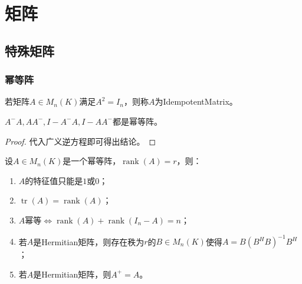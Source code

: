 \chapter{矩阵}









\section{特殊矩阵}
\subsection{幂等阵}
\begin{definition}
	若矩阵$A\in M_{n}(K)$满足$A^2=I_n$，则称$A$为\gls{IdempotentMatrix}。
\end{definition}
\begin{theorem}\label{theo:A^-AIdempotent}
	$A^-A,AA^-,I-A^-A,I-AA^-$都是幂等阵。
\end{theorem}
\begin{proof}
	代入广义逆方程即可得出结论。
\end{proof}
\begin{property}\label{prop:IdempotentMat}
	设$A\in M_{n}(K)$是一个幂等阵，$\operatorname{rank}(A)=r$，则：
	\begin{enumerate}
		\item $A$的特征值只能是$1$或$0$；
		\item $\operatorname{tr}(A)=\operatorname{rank}(A)$；
		\item $A\text{幂等}\iff\operatorname{rank}(A)+\operatorname{rank}(I_n-A)=n$；
		\item 若$A$是Hermitian矩阵，则存在秩为$r$的$B\in M_{n}(K)$使得$A=B(B^HB)^{-1}B^H$；
		\item 若$A$是Hermitian矩阵，则$A^+=A$。
	\end{enumerate}
\end{property}
